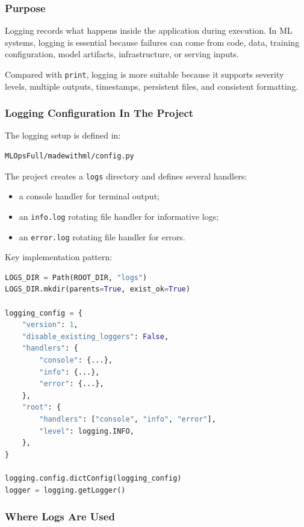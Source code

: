 \documentclass[11pt,a4paper]{article}
\begin{document}
\subsubsection{Purpose}

Logging records what happens inside the application during execution. In ML systems, logging is essential because failures can come from code, data, training configuration, model artifacts, infrastructure, or serving inputs.

Compared with \texttt{print}, logging is more suitable because it supports severity levels, multiple outputs, timestamps, persistent files, and consistent formatting.

\subsubsection{Logging Configuration In The Project}

The logging setup is defined in:

\begin{lstlisting}[style=projectcode]
MLOpsFull/madewithml/config.py
\end{lstlisting}

The project creates a \texttt{logs} directory and defines several handlers:

\begin{itemize}
    \item a console handler for terminal output;
    \item an \texttt{info.log} rotating file handler for informative logs;
    \item an \texttt{error.log} rotating file handler for errors.
\end{itemize}

Key implementation pattern:

\begin{lstlisting}[style=projectcode,language=Python]
LOGS_DIR = Path(ROOT_DIR, "logs")
LOGS_DIR.mkdir(parents=True, exist_ok=True)

logging_config = {
    "version": 1,
    "disable_existing_loggers": False,
    "handlers": {
        "console": {...},
        "info": {...},
        "error": {...},
    },
    "root": {
        "handlers": ["console", "info", "error"],
        "level": logging.INFO,
    },
}

logging.config.dictConfig(logging_config)
logger = logging.getLogger()
\end{lstlisting}

\subsubsection{Where Logs Are Used}
\end{document}
